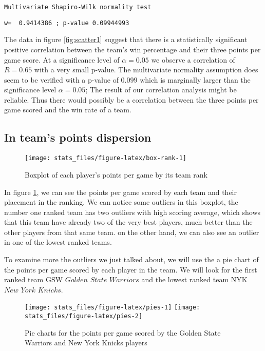 \documentclass[
  12pt,
]{article}
\begin{document}
\begin{verbatim}
Multivariate Shapiro-Wilk normality test
\end{verbatim}

\begin{verbatim}
w=  0.9414386 ; p-value 0.09944993
\end{verbatim}

The data in figure \ref{fig:scatter1} suggest that there is a statistically significant positive correlation between the team's win percentage and their three points per game score.
\newpage
At a significance level of \(\alpha=0.05\) we observe a correlation of \(R=0.65\) with a very small p-value. The multivariate normality assumption does seem to be verified with a p-value of \(0.099\) which is marginally larger than the significance level \(\alpha=0.05\); The result of our correlation analysis might be reliable. Thus there would possibly be a correlation between the three points per game scored and the win rate of a team.

\hypertarget{sec:PPGinTeams}{%
\subsection{In team's points dispersion}\label{sec:PPGinTeams}}

\begin{figure}

{\centering \texttt{[image: stats\_files/figure-latex/box-rank-1]} 

}

\caption{Boxplot of each player's points per game by its team rank}\label{fig:box-rank}
\end{figure}

In figure \ref{fig:box-rank}, we can see the points per game scored by each team and their placement in the ranking. We can notice some outliers in this boxplot, the number one ranked team has two outliers with high scoring average, which shows that this team have already two of the very best players, much better than the other players from that same team. on the other hand, we can also see an outlier in one of the lowest ranked teams.

To examine more the outliers we just talked about, we will use the a pie chart of the points per game scored by each player in the team. We will look for the first ranked team GSW \(Golden\) \(State\) \(Warriors\) and the lowest ranked team NYK \(New\) \(York\) \(Knicks\).

\begin{figure}
\texttt{[image: stats\_files/figure-latex/pies-1]} \texttt{[image: stats\_files/figure-latex/pies-2]} \caption{Pie charts for the points per game scored by the Golden State Warriors and New York Knicks players}\label{fig:pies}
\end{figure}
\end{document}

